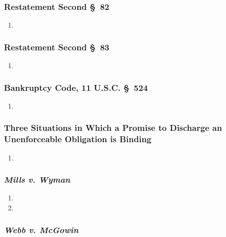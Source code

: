 \subsubsection{Restatement Second \S\ 82}

\begin{enumerate}
    \item %
\end{enumerate}

\subsubsection{Restatement Second \S\ 83}

\begin{enumerate}
    \item %
\end{enumerate}

\subsubsection{Bankruptcy Code, 11 U.S.C. \S\ 524}

\begin{enumerate}
    \item %
\end{enumerate}

\subsubsection{Three Situations in Which a Promise to Discharge an Unenforceable 
Obligation is Binding}

\begin{enumerate}
    \item %
\end{enumerate}

\subsubsection{\emph{Mills v. Wyman}}

\begin{enumerate}
    \item %
    \item %
\end{enumerate}

\subsubsection{\emph{Webb v. McGowin}}

